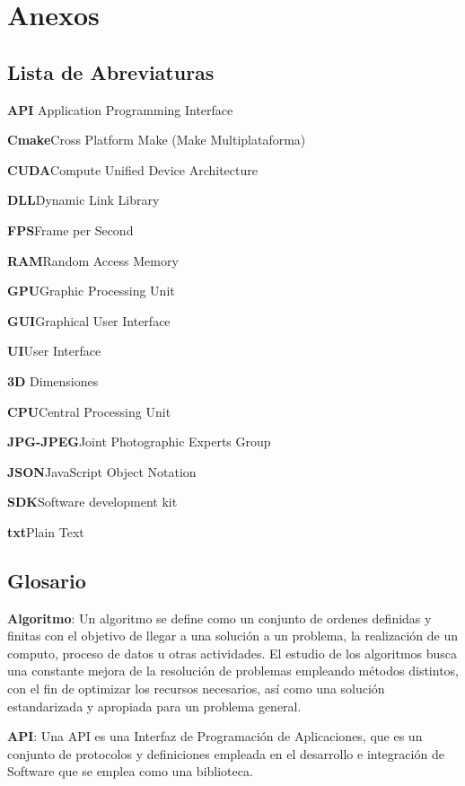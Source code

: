 \chapter{Anexos}

\section{Lista de Abreviaturas}

\hspace{5mm} \textbf{API} \tab Application Programming Interface

\textbf{Cmake}\tab	Cross Platform Make (Make Multiplataforma)

\textbf{CUDA}\tab  Compute Unified Device Architecture

\textbf{DLL}\tab   Dynamic Link Library

\textbf{FPS}\tab  Frame per Second

\textbf{RAM}\tab  Random Access Memory

\textbf{GPU}\tab Graphic Processing Unit

\textbf{GUI}\tab  Graphical User Interface

\textbf{UI}\tab User Interface

\textbf{3D} Dimensiones

\textbf{CPU}\tab Central Processing Unit

\textbf{JPG-JPEG}\tab  Joint Photographic Experts Group 

\textbf{JSON}\tab  JavaScript Object Notation

\textbf{SDK}\tab  Software development kit

\textbf{txt}\tab  Plain Text


\newpage
\section{Glosario}


\textbf{Algoritmo}: Un algoritmo se define como un conjunto de ordenes definidas y finitas con el objetivo de llegar a una solución a un problema, la realización de un computo, proceso de datos u otras actividades. El estudio de los algoritmos busca una constante mejora de la resolución de problemas empleando métodos distintos, con el fin de optimizar los recursos necesarios, así como una solución estandarizada y apropiada para un problema general.

\textbf{API}: Una API es una Interfaz de Programación de Aplicaciones, que es un conjunto de protocolos y definiciones empleada en el desarrollo e integración de Software que se emplea como una biblioteca.

